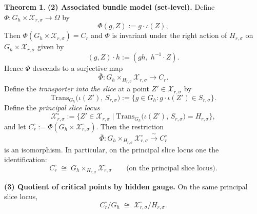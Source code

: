\documentclass{article}
\theoremstyle{definition}
\newtheorem{theorem}{Theorem}[section]
\begin{document}
\begin{theorem}
\medskip\noindent
\textbf{(2) Associated bundle model (set-level).}
Define $\Phi \colon G_h \times \mathcal X_{r,\sigma} \to \Omega$ by
\begin{equation}\tag{23}
\Phi(g, Z) := g \cdot \iota(Z),
\end{equation}
Then $\Phi(G_h \times \mathcal X_{r,\sigma}) = C_r$ and $\Phi$ is invariant under the right action of $H_{r,\sigma}$ on $G_h \times \mathcal X_{r,\sigma}$ given by
\begin{equation}\tag{24}
(g, Z) \cdot h := (g h,\; h^{-1} \cdot Z).
\end{equation}
Hence $\Phi$ descends to a surjective map
\[
\bar\Phi \colon G_h \times_{H_{r,\sigma}} \mathcal X_{r,\sigma} \longrightarrow C_r.
\]
Define the \emph{transporter into the slice} at a point $Z' \in \mathcal X_{r,\sigma}$ by
\[
\mathrm{Trans}_{G_h}\!\bigl(\iota(Z'),\, S_{r,\sigma}\bigr)
:= \bigl\{ g \in G_h : g \cdot \iota(Z') \in S_{r,\sigma} \bigr\}.
\]
Define the \emph{principal slice locus}
\[
\mathcal X_{r,\sigma}^{\circ} := \bigl\{ Z' \in \mathcal X_{r,\sigma} \;\big|\;
\mathrm{Trans}_{G_h}\!\bigl(\iota(Z'),\, S_{r,\sigma}\bigr) = H_{r,\sigma} \bigr\},
\]
and let $C_r^{\circ} := \Phi(G_h \times \mathcal X_{r,\sigma}^{\circ})$.
Then the restriction
\[
\bar\Phi \colon G_h \times_{H_{r,\sigma}} \mathcal X_{r,\sigma}^{\circ}
\xrightarrow{\;\sim\;} C_r^{\circ}
\]
is an isomorphism.  In particular, on the principal slice locus one the identification:
\begin{equation}\tag{25}
C_r^{\circ} \;\cong\; G_h \times_{H_{r,\sigma}} \mathcal X_{r,\sigma}^{\circ}
\qquad\text{(on the principal slice locus).}
\end{equation}

\medskip\noindent
\textbf{(3) Quotient of critical points by hidden gauge.}  On the same principal slice locus,
\begin{equation}\tag{26}
C_r^{\circ} / G_h \;\cong\; \mathcal X_{r,\sigma}^{\circ} / H_{r,\sigma}.
\end{equation}
\end{theorem}
\end{document}
